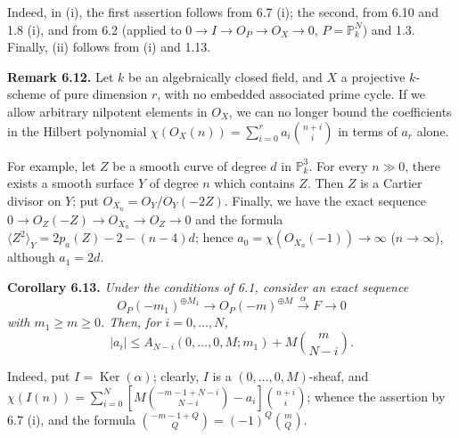 %
Indeed, in (i), the first assertion follows from 6.7 (i); the second, from 6.10 and 1.8 (i), and from 6.2 (applied to $0\to I\to{O}_P\to{O}_X\to0$, $P=\mathbb P^N_k$) and 1.3. Finally, (ii) follows from (i) and 1.13.

\textbf{Remark 6.12.} Let $k$ be an algebraically closed field, and $X$ a projective $k$-scheme of pure dimension $r$, with no embedded associated prime cycle. If we allow arbitrary nilpotent elements in ${O}_X$, we can no longer bound the coefficients in the Hilbert polynomial $\chi({O}_X(n))=\sum_{i=0}^{r}a_i\binom{n+i}{i}$ in terms of $a_r$ alone.

For example, let $Z$ be a smooth curve of degree $d$ in $\mathbb P^3_k$. For every $n\gg0$, there exists a smooth surface $Y$ of degree $n$ which contains $Z$. Then $Z$ is a Cartier divisor on $Y$; put ${O}_{X_n}={O}_Y/{O}_Y(-2Z)$. Finally, we have the exact sequence $0\to{O}_Z(-Z)\to{O}_{X_n}\to{O}_Z\to0$ and the formula $\langle Z^2\rangle_Y=2p_a(Z)-2-(n-4)d$; hence $a_0=\chi({O}_{X_n}(-1))\to\infty$ ($n\to\infty$), although $a_1=2d$.

\textbf{Corollary 6.13.} \emph{Under the conditions of 6.1, consider an exact sequence}
\[
   {O}_P(-m_1)^{\oplus M_1}\longrightarrow
   {O}_P(-m)^{\oplus M}\xrightarrow{\alpha}F\longrightarrow0
\]
\emph{with $m_1\ge m\ge0$. Then, for $i=0,\ldots,N$,}
\[
   |a_i|\le A_{N-i}(0,\ldots,0,M;m_1)+M\binom{m}{N-i}.
\]

Indeed, put $I=\operatorname{Ker}(\alpha)$; clearly, $I$ is a $(0,\ldots,0,M)$-sheaf, and $\chi(I(n))=\sum_{i=0}^{N}\left[M\binom{-m-1+N-i}{N-i}-a_i\right]\binom{n+i}{i}$; whence the assertion by 6.7 (i), and the formula $\binom{-m-1+Q}{Q}=(-1)^Q\binom{m}{Q}$.

